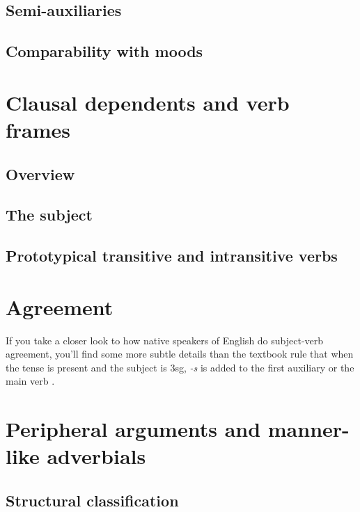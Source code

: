 \documentclass[UTF8, a4paper, oneside, scheme=plain, 12pt]{ctexbook}
\newcommand*{\citesec}[1]{\S~{#1}}
\newcommand*{\citechap}[1]{Ch.~{#1}}
\newcommand{\form}[1]{\emph{#1}}
\begin{document}
\subsection{Semi-auxiliaries}\label{sec:semi-auxiliary}

\subsection{Comparability with moods}\label{sec:tam-mood-compatibility}


\section{Clausal dependents and verb frames}\label{sec:valency.overview}

\subsection{Overview}








\subsection{The subject}\label{sec:subject}

\subsection{Prototypical transitive and intransitive verbs}


\section{Agreement}

If you take a closer look to how native speakers of English do subject-verb agreement,
you'll find some more subtle details than 
the textbook rule that when the tense is \acl{present}
and the subject is 3sg, 
\form{-s} is added to the first auxiliary or the main verb
\citep[\citechap{5}, \citesec{18}]{cgel}.



\section{Peripheral arguments and manner-like adverbials}\label{sec:vp.peripheral}

\subsection{Structural classification}
\end{document}
